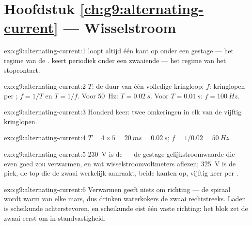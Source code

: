 \section*{Hoofdstuk \ref{ch:g9:alternating-current} --- Wisselstroom}

\begin{solution}{exo:g9:alternating-current:1}
 loopt altijd één kant op onder een gestage
 --- het regime van de .
 keert periodiek onder een zwaaiende
 --- het regime van het stopcontact.
\end{solution}

\begin{solution}{exo:g9:alternating-current:2}
$T$: de duur van één volledige kringloop; $f$: kringlopen per
; $f = 1/T$ en $T = 1/f$. Voor \qty{50}{Hz}: $T =
\qty{0.02}{s}$. Voor $T = \qty{0.01}{s}$: $f = \qty{100}{Hz}$.
\end{solution}

\begin{solution}{exo:g9:alternating-current:3}
Honderd keer: twee omkeringen in elk van de vijftig kringlopen.
\end{solution}

\begin{solution}{exo:g9:alternating-current:4}
$T = 4 \times 5 = \qty{20}{ms} = \qty{0.02}{s}$; $f = 1/0.02 =
\qty{50}{Hz}$.
\end{solution}

\begin{solution}{exo:g9:alternating-current:5}
\qty{230}{V} is de  --- de gestage
gelijkstroomwaarde die even goed zou verwarmen, en wat
wisselstroomvoltmeters aflezen; \qty{325}{V} is de piek, de
top die de zwaai werkelijk aanraakt, beide kanten op, vijftig keer per
.
\end{solution}

\begin{solution}{exo:g9:alternating-current:6}
Verwarmen geeft niets om richting --- de spiraal wordt warm van elke
mars, dus drinken waterkokers de zwaai rechtstreeks. Laden is
scheikunde achterstevoren, en scheikunde eist één vaste richting: het
blok zet de zwaai eerst om in standvastigheid.
\end{solution}

